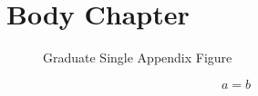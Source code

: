 \documentclass[degree=master, academic=true, fontset=fandol]{nwputhesis}
\begin{document}
\START
\showoutput

\frontmatter
\mainmatter
\chapter{Body Chapter}

\begin{thesisappendix}
\makeatletter
{}
\makeatother

\begin{figure}[htbp]
    \caption{Graduate Single Appendix Figure}
\end{figure}

\begin{table}[htbp]
    \caption{Graduate Single Appendix Table}
\end{table}

\begin{algorithm}[htbp]
    \caption{Graduate Single Appendix Algorithm}
\end{algorithm}

\begin{equation}
    a=b
\end{equation}
\end{thesisappendix}

\clearpage
\OMIT
\end{document}
